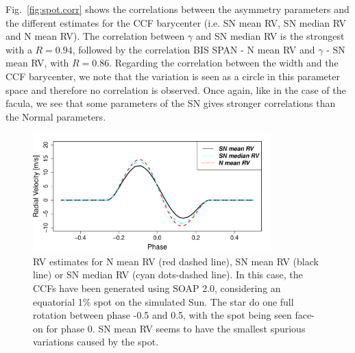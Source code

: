 \documentclass{aa}
\begin{document}
Fig.~\ref{fig:spot.corr} shows the correlations between the asymmetry parameters and the different estimates for the CCF barycenter (i.e. SN mean RV, SN median RV and N mean RV). The correlation between $\gamma$ and SN median RV is the strongest with a $R=0.94$, followed by the correlation BIS SPAN - N mean RV and $\gamma$ - SN mean RV, with $R=0.86$. Regarding the correlation between the width and the CCF barycenter, we note that the variation is seen as a circle in this parameter space and therefore no correlation is observed. Once again, like in the case of the facula, we see that some parameters of the SN gives stronger correlations than the Normal parameters.

\begin{figure}[htbp]
\begin{center}
\includegraphics[width=3.6in]{RV_comparison_SPOT.pdf} 
\caption{RV estimates for N mean RV (red dashed line),  SN mean RV (black line) or SN median RV (cyan dots-dashed line). In this case, the CCFs have been generated using SOAP 2.0, considering an equatorial 1\% spot on the simulated Sun. The star do one full rotation between phase -0.5 and 0.5, with the spot being seen face-on for phase 0. SN mean RV seems to have the smallest spurious variations caused by the spot.}
    \label{fig:spot}
\end{center}
\end{figure}
\end{document}
